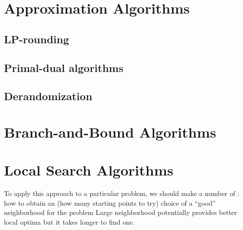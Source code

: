\documentclass{myproc}
\begin{document}
\section{Approximation Algorithms}
\subsection{LP-rounding}
\subsection{Primal-dual algorithms}
\subsection{Derandomization}
\section{Branch-and-Bound Algorithms}


\section{Local Search Algorithms}
\bit
\w To apply this approach to a particular problem, we should make 
a number of :
  \bit
  \w how to obtain an 
    (how many starting points to try)
  \w choice of a ``good'' neighborhood for the problem
  \eit
\w Large neighborhood potentially provides better local optima but it takes
  longer to find one.
\eit
\end{document}
